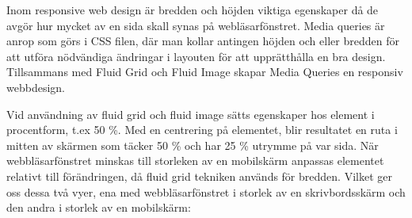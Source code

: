\documentclass[11pt]{article}
\begin{document}
Inom responsive web design är bredden och höjden viktiga egenskaper då de avgör hur mycket av en sida skall synas på webläsarfönstret.  Media queries är anrop som görs i CSS filen, där man kollar antingen höjden och eller bredden för att utföra nödvändiga ändringar i layouten för att upprätthålla en bra design. Tillsammans med Fluid Grid och Fluid Image skapar Media Queries en responsiv webbdesign. 

\newpage

Vid användning av fluid grid och fluid image sätts egenskaper hos element i procentform, t.ex 50 \%. Med en centrering på elementet, blir resultatet en ruta i mitten av skärmen som täcker 50 \% och har 25 \% utrymme på var sida. När webbläsarfönstret minskas till storleken av en mobilskärm anpassas elementet relativt till förändringen, då fluid grid tekniken används för bredden. Vilket ger oss dessa två vyer, ena med webbläsarfönstret i storlek av en skrivbordsskärm och den andra i storlek av en mobilskärm:
\end{document}
